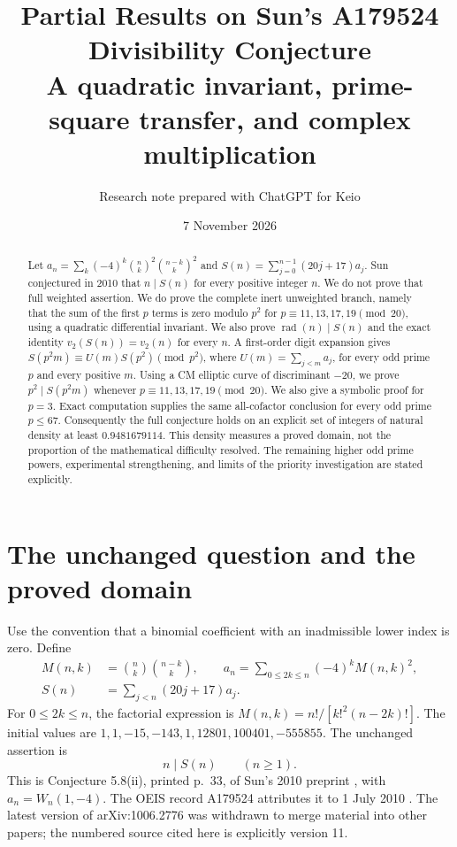 \documentclass[11pt,a4paper]{article}
\title{\textbf{Partial Results on Sun's A179524\\Divisibility Conjecture}\\[5pt]\large A quadratic invariant, prime-square transfer, and complex multiplication}
\author{Research note prepared with ChatGPT for Keio}
\date{7 November 2026}
\theoremstyle{remark}\newtheorem{remark}[theorem]{Remark}
\newcommand{\rad}{\operatorname{rad}}
\begin{document}
\maketitle
\begin{abstract}
Let \(a_n=\sum_k(-4)^k\binom nk^2\binom{n-k}k^2\) and
\(S(n)=\sum_{j=0}^{n-1}(20j+17)a_j\). Sun conjectured in 2010 that
\(n\mid S(n)\) for every positive integer \(n\). We do not prove that full
weighted assertion. We do prove the complete inert unweighted branch,
namely that the sum of the first $p$ terms is zero modulo $p^2$ for
$p\equiv11,13,17,19\pmod{20}$, using a quadratic differential invariant.
We also prove \(\rad(n)\mid S(n)\) and the exact identity
\(v_2(S(n))=v_2(n)\) for every \(n\). A first-order digit expansion gives
\(S(p^2m)\equiv U(m)S(p^2)\pmod {p^2}\), where
\(U(m)=\sum_{j<m}a_j\), for every odd prime \(p\) and every positive \(m\).
Using a CM elliptic curve of discriminant \(-20\), we prove
\(p^2\mid S(p^2m)\) whenever \(p\equiv11,13,17,19\pmod {20}\).
We also give a symbolic proof for \(p=3\). Exact computation supplies the
same all-cofactor conclusion for every odd prime \(p\le67\).
Consequently the full conjecture holds on an explicit set of integers
of natural density at least \(0.9481679114\). This density measures a
proved domain, not the proportion of the mathematical difficulty resolved.
The remaining higher odd prime powers, experimental strengthening, and
limits of the priority investigation are stated explicitly.
\end{abstract}

\section{The unchanged question and the proved domain}

Use the convention that a binomial coefficient with an inadmissible lower
index is zero. Define
\begin{equation}\label{def}
 \begin{aligned}
 M(n,k)&=\binom nk\binom{n-k}k,\qquad
 a_n=\sum_{0\le2k\le n}(-4)^k M(n,k)^2,\\
 S(n)&=\sum_{j<n}(20j+17)a_j .
 \end{aligned}
\end{equation}
For \(0\le2k\le n\), the factorial expression is
\(M(n,k)=n!/[k!^2(n-2k)!]\).
The initial values are \(1,1,-15,-143,1,12801,100401,-555855\).
The unchanged assertion is
\begin{equation}\label{target}
                     n\mid S(n)\qquad(n\ge1).
\end{equation}
This is Conjecture 5.8(ii), printed p.~33, of Sun's 2010 preprint
\cite{Sun2010}, with \(a_n=W_n(1,-4)\). The OEIS record
A179524 attributes it to 1 July 2010 \cite{OEIS}. The latest version of
arXiv:1006.2776 was withdrawn to merge material into other papers; the
numbered source cited here is explicitly version 11.
\end{document}
